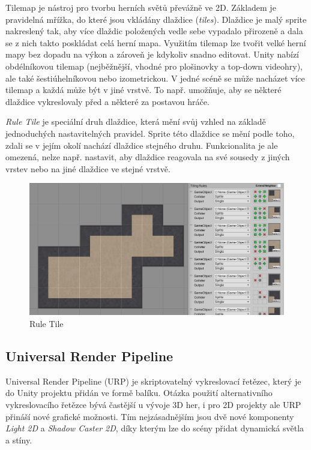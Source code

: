 \documentclass[FM,Proj]{tulthesis}
\begin{document}
	Tilemap je nástroj pro tvorbu herních světů převážně ve 2D. Základem je pravidelná mřížka, do které jsou vkládány dlaždice (\textit{tiles}). Dlaždice je malý sprite nakreslený tak, aby více dlaždic položených vedle sebe vypadalo přirozeně a dala se z nich takto poskládat celá herní mapa. Využitím tilemap lze tvořit velké herní mapy bez dopadu na výkon a zároveň je kdykoliv snadno editovat. Unity nabízí obdélníkovou tilemap (nejběžnější, vhodné pro plošinovky a top-down videohry), ale také šestiúhelníkovou nebo izometrickou. V jedné scéně se může nacházet více tilemap a každá může být v jiné vrstvě. To např. umožňuje, aby se některé dlaždice vykreslovaly před a některé za postavou hráče.
	
	\textit{Rule Tile} je speciální druh dlaždice, která mění svůj vzhled na základě jednoduchých nastavitelných pravidel. Sprite této dlaždice se mění podle toho, zdali se v jejím okolí nachází dlaždice stejného druhu. Funkcionalita je ale omezená, nelze např. nastavit, aby dlaždice reagovala na své sousedy z jiných vrstev nebo na jiné dlaždice ve stejné vrstvě.
	
	\begin{figure}[ht]
		\centering
		\includegraphics[width=\textwidth]{img/RuleTile}
		\caption{Rule Tile}
	\end{figure}
	
	\subsection{Universal Render Pipeline}

	Universal Render Pipeline (URP) je skriptovatelný vykreslovací řetězec, který je do Unity projektu přidán ve formě balíku. Otázka použití alternativního vykreslovacího řetězce bývá častější u vývoje 3D her, i pro 2D projekty ale URP přináší nové grafické možnosti. Tím nejzásadnějším jsou dvě nové komponenty \textit{Light 2D} a \textit{Shadow Caster 2D}, díky kterým lze do scény přidat dynamická světla a stíny.
	
\end{document}
